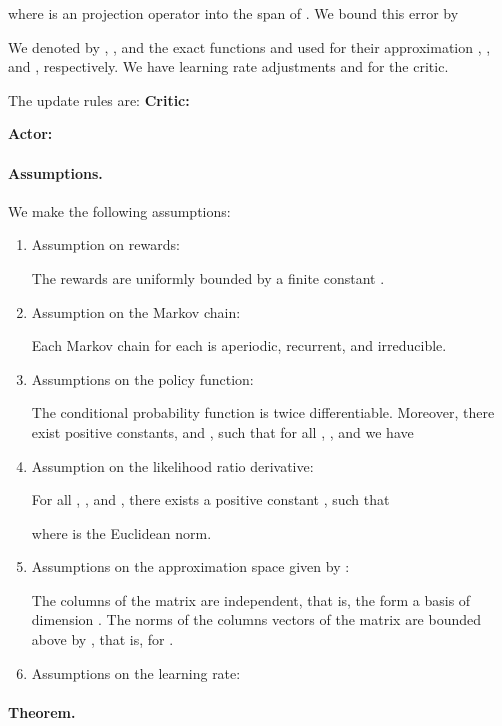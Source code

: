 \documentclass{article}
\begin{document}
where  is an projection operator into the span of
.
We bound this error by


We denoted by , , and  the exact
functions and used for their approximation , , and ,
respectively.
We have learning rate adjustments  and  for the
critic.

The update rules are:\newline
{\bf Critic:}

{\bf Actor:}


\paragraph{Assumptions.}
We make the following assumptions:
\begin{enumerate}[label=\textbf{(A\arabic*)}]
\item Assumption on rewards:

The rewards  are uniformly bounded by a
finite constant .

\item Assumption on the Markov chain:

Each Markov chain for each  is aperiodic, recurrent, and
irreducible.

\item Assumptions on the policy function:

The conditional probability function 
is twice differentiable. Moreover, there exist positive constants,
 and , such that for all ,
,  and  we
have


\item Assumption on the likelihood ratio derivative:

For all ,
, and , there exists a positive
constant , such that

where  is the Euclidean  norm.

\item Assumptions on the approximation space given by :

The columns of the matrix  are independent, that is, the form a
basis of dimension .
The norms of the columns vectors of the matrix  are bounded
above by , that is,  for .

\item Assumptions on the learning rate:


\end{enumerate}


\paragraph{Theorem.}
\end{document}
